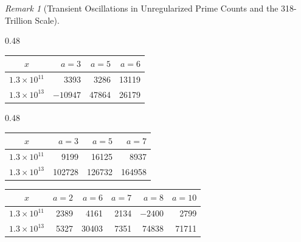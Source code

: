 \documentclass[12pt,reqno]{amsart}
\theoremstyle{definition}
\theoremstyle{remark}
\newtheorem{remark}[theorem]{Remark}
\numberwithin{equation}{section}
\begin{document}
\begin{remark}[Transient Oscillations in Unregularized Prime Counts and the 318-Trillion Scale]
\begin{table}[htbp]
\begin{subtable}[t]{0.48\textwidth}
\centering
\begin{tabular}{crrr}
\toprule
$x$ & $a=3$ & $a=5$ & $a=6$ \\
\midrule
$1.3\times 10^{11}$ & 3393 & 3286 &\colorbox{gray!30}{13119} \\
$1.3\times 10^{13}$ & $-10947$ & \colorbox{gray!30}{47864} & 26179 \\
\bottomrule
\end{tabular}
\label{tab:N7}
\end{subtable}
\hfill
\begin{subtable}[t]{0.48\textwidth}
\centering
\begin{tabular}{crrr}
\toprule
$x$ & $a=3$ & $a=5$ & $a=7$ \\
\midrule
$1.3\times 10^{11}$ & 9199 & \colorbox{gray!30}{16125} & 8937 \\
$1.3\times 10^{13}$ & 102728 & 126732 & \colorbox{gray!30}{164958} \\
\bottomrule
\end{tabular}
\label{tab:N8}
\end{subtable}

\vspace{1.5em} %

\begin{subtable}[t]{\textwidth}
\centering
\begin{tabular}{crrrrr}
\toprule
$x$ & $a=2$ & $a=6$ & $a=7$ & $a=8$ & $a=10$ \\
\midrule
$1.3\times 10^{11}$ & 2389 & \colorbox{gray!30}{4161} & 2134 & $-2400$ & 2799 \\
$1.3\times 10^{13}$ & 5327 & 30403 & 7351 & \colorbox{gray!30}{74838} & 71711 \\
\bottomrule
\end{tabular}
\label{tab:N11}
\end{subtable}

\vspace{1.5em} %


\end{table}
\end{remark}
\end{document}
